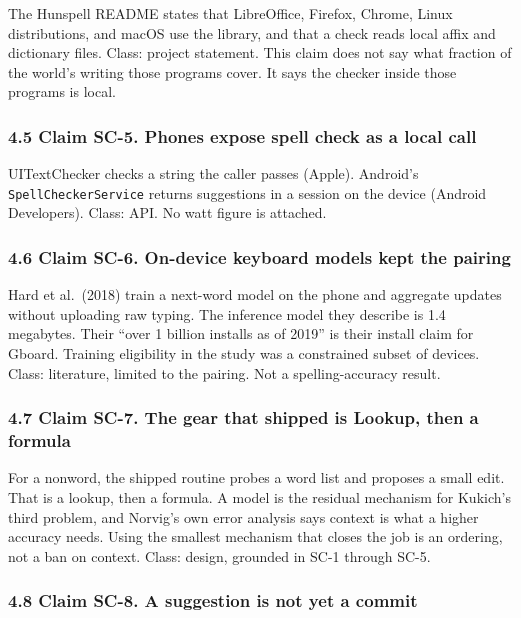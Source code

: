 \documentclass[
  10pt,
]{article}
\begin{document}
The Hunspell README states that LibreOffice, Firefox, Chrome, Linux
distributions, and macOS use the library, and that a check reads local
affix and dictionary files. Class: project statement. This claim does
not say what fraction of the world's writing those programs cover. It
says the checker inside those programs is local.

\subsubsection{4.5 Claim SC-5. Phones expose spell check as a local
call}\label{claim-sc-5.-phones-expose-spell-check-as-a-local-call}

UITextChecker checks a string the caller passes (Apple). Android's
\texttt{SpellCheckerService} returns suggestions in a session on the
device (Android Developers). Class: API. No watt figure is attached.

\subsubsection{4.6 Claim SC-6. On-device keyboard models kept the
pairing}\label{claim-sc-6.-on-device-keyboard-models-kept-the-pairing}

Hard et al.~(2018) train a next-word model on the phone and aggregate
updates without uploading raw typing. The inference model they describe
is 1.4 megabytes. Their ``over 1 billion installs as of 2019'' is their
install claim for Gboard. Training eligibility in the study was a
constrained subset of devices. Class: literature, limited to the
pairing. Not a spelling-accuracy result.

\subsubsection{4.7 Claim SC-7. The gear that shipped is Lookup, then a
formula}\label{claim-sc-7.-the-gear-that-shipped-is-lookup-then-a-formula}

For a nonword, the shipped routine probes a word list and proposes a
small edit. That is a lookup, then a formula. A model is the residual
mechanism for Kukich's third problem, and Norvig's own error analysis
says context is what a higher accuracy needs. Using the smallest
mechanism that closes the job is an ordering, not a ban on context.
Class: design, grounded in SC-1 through SC-5.

\subsubsection{4.8 Claim SC-8. A suggestion is not yet a
commit}\label{claim-sc-8.-a-suggestion-is-not-yet-a-commit}
\end{document}
